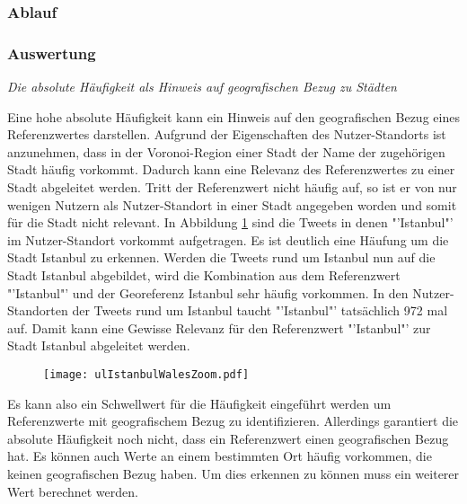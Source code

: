 
			\subsubsection{Ablauf}

			\subsubsection{Auswertung}  

				\textit{Die absolute Häufigkeit als Hinweis auf geografischen Bezug zu Städten} 
				
				Eine hohe absolute Häufigkeit kann ein Hinweis auf den geografischen Bezug eines Referenzwertes darstellen. 
				Aufgrund der Eigenschaften des Nutzer-Standorts ist anzunehmen, dass in der Voronoi-Region einer Stadt der Name der zugehörigen Stadt häufig vorkommt.
				Dadurch kann eine Relevanz des Referenzwertes zu einer Stadt abgeleitet werden. 
				Tritt der Referenzwert nicht häufig auf, so ist er von nur wenigen Nutzern als Nutzer-Standort in einer Stadt angegeben worden und somit für die Stadt nicht relevant.
				In Abbildung \ref{img:ulIstanbulWalesZoom} sind die Tweets in denen "'Istanbul"' im Nutzer-Standort vorkommt aufgetragen.
				Es ist deutlich eine Häufung um die Stadt Istanbul zu erkennen. 
				Werden die Tweets rund um Istanbul nun auf die Stadt Istanbul abgebildet, wird die Kombination aus dem Referenzwert "'Istanbul"' und der Georeferenz Istanbul sehr häufig vorkommen.
				In den Nutzer-Standorten der Tweets rund um Istanbul taucht "'Istanbul"' tatsächlich 972 mal auf.
				Damit kann eine Gewisse Relevanz für den Referenzwert "'Istanbul"' zur Stadt Istanbul abgeleitet werden.

				\begin{figure}[!ht]
						\begin{center}
							\texttt{[image: ulIstanbulWalesZoom.pdf]}
							\caption{}
							\label{img:ulIstanbulWalesZoom}
						\end{center}
				\end{figure}	

				Es kann also ein Schwellwert für die Häufigkeit eingeführt werden um Referenzwerte mit geografischem Bezug zu identifizieren.
				Allerdings garantiert die absolute Häufigkeit noch nicht, dass ein Referenzwert einen geografischen Bezug hat. 
				Es können auch Werte an einem bestimmten Ort häufig vorkommen, die keinen geografischen Bezug haben.
				Um dies erkennen zu können muss ein weiterer Wert berechnet werden.

